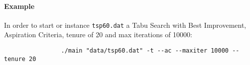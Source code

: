 		\paragraph{Example} In order to start or instance \verb|tsp60.dat| a Tabu Search with Best Improvement, Aspiration Criteria, tenure of 20 and max iterations of 10000:
		\begin{center}
			\begin{verbatim}
				./main "data/tsp60.dat" -t --ac --maxiter 10000 --tenure 20
			\end{verbatim}
		\end{center}
